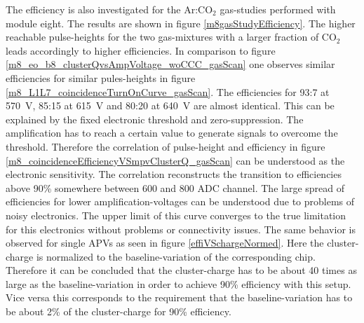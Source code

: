 \documentclass[
twoside,            %
BCOR1.4cm,          %
10pt,               %
headings=normal,    %
headsepline,        %
clearplainpage,		%
final,              %
div=14,
open=right,
bibliography=toc
]{scrreprt}
\begin{document}
The efficiency is also investigated for the Ar:CO$_2$ gas-studies performed with module eight.
The results are shown in figure \ref{m8gasStudyEfficiency}.
The higher reachable pulse-heights for the two gas-mixtures with a larger fraction of CO$_{2}$ leads accordingly to higher efficiencies.
In comparison to figure \ref{m8_eo_b8_clusterQvsAmpVoltage_woCCC_gasScan} one observes similar efficiencies for similar pules-heights in figure \ref{m8_L1L7_coincidenceTurnOnCurve_gasScan}.
The efficiencies for 93:7 at \SI{570}{V}, 85:15 at \SI{615}{V} and 80:20 at \SI{640}{V} are almost identical.
This can be explained by the fixed electronic threshold and zero-suppression.
The amplification has to reach a certain value to generate signals to overcome the threshold.
Therefore the correlation of pulse-height and efficiency in figure \ref{m8_coincidenceEfficiencyVSmpvClusterQ_gasScan} can be understood as the electronic sensitivity.
The correlation reconstructs the transition to efficiencies above 90\% somewhere between 600 and 800 ADC channel.
The large spread of efficiencies for lower amplification-voltages can be understood due to problems of noisy electronics.
The upper limit of this curve converges to the true limitation for this electronics without problems or connectivity issues.
The same behavior is observed for single APVs as seen in figure \ref{effiVSchargeNormed}.
Here the cluster-charge is normalized to the baseline-variation of the corresponding chip.
Therefore it can be concluded that the cluster-charge has to be about 40 times as large as the baseline-variation in order to achieve 90\% efficiency with this setup.
Vice versa this corresponds to the requirement that the baseline-variation has to be about 2\% of the cluster-charge for 90\% efficiency.
\end{document}
